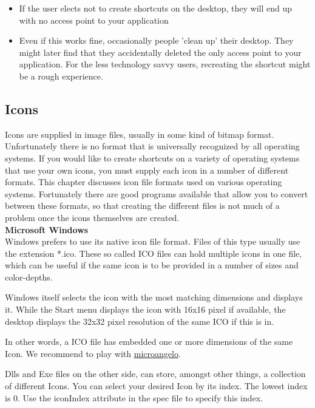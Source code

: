 \begin{itemize}
\item If the user elects not to create shortcuts on the desktop, they
      will end up with no access point to your application
\item Even if this works fine, occasionally people 'clean up' their
      desktop. They might later find that they accidentally deleted the
      only access point to your application. For the less technology
      savvy users, recreating the shortcut might be a rough experience.
\end{itemize}

\subsection{Icons}

Icons are supplied in image files, usually in some kind of bitmap
format. Unfortunately there is no format that is universally recognized
by all operating systems. If you would like to create shortcuts on a
variety of operating systems that use your own icons, you must supply
each icon in a number of different formats. This chapter discusses icon
file formats used on various operating systems. Fortunately there are
good programs available that allow you to convert between these formats,
so that creating the different files is not much of a problem once the
icons themselves are created.\\

\textbf{Microsoft Windows}\\

Windows prefers to use its native icon file format. Files of this type
usually use the extension *.ico. These so called ICO files can hold
multiple icons in one file, which can be useful if the same icon is
to be provided in a number of sizes and color-depths.

Windows itself selects the icon with the most matching dimensions and displays it.
While the Start menu displays the icon with 16x16 pixel if available, the desktop displays
the 32x32 pixel resolution of the same ICO if this is in.

In other words, a ICO file has embedded one or more dimensions of the same Icon.
We recommend to play with \href{http://www.microangelo.us}{microangelo}.

Dlls and Exe files on the other side, can store, amongst other things, a collection of different Icons.
You can select your desired Icon by its index. The lowest index is 0.
Use the iconIndex attribute in the spec file to specify this index.\\

